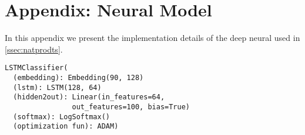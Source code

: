 \documentclass[acmsmall,nonacm]{acmart}\settopmatter{printfolios=true,printccs=false,printacmref=false}
\newcommand{\qqpi}[2]{[\![#2]\!]_{#1}}
\newcommand{\restate}[1]{\textsc{Restatement of #1}. \hspace*{1pt} \it}
\begin{document}









\section{Appendix: Neural Model }\label{app:neural} 
In this appendix we present the implementation details of the deep neural  used in \cref{ssec:natprodts}.
\begin{lstlisting}[numbers=none,caption={Our Character Level \textit{LSTM} model.},captionpos=b]
  LSTMClassifier(
  (embedding): Embedding(90, 128)
  (lstm): LSTM(128, 64)
  (hidden2out): Linear(in_features=64, 
                out_features=100, bias=True)
  (softmax): LogSoftmax()
  (optimization fun): ADAM)
\end{lstlisting}
\end{document}

